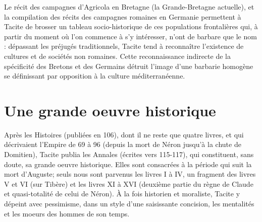 \documentclass{cornouaille}
\begin{document}
Le récit des campagnes d'Agricola en Bretagne (la Grande-Bretagne actuelle),
 et la compilation des récits des campagnes romaines en Germanie
 permettent à Tacite de brosser 
un tableau socio-historique de ces populations frontalières qui,
 à partir du moment où l'on commence à s'y intéresser,
 n'ont de barbare que le nom :
 dépassant les préjugés traditionnels,
 Tacite tend à reconnaître l'existence de cultures 
et de sociétés non romaines.
 Cette reconnaissance indirecte de la spécificité des Bretons et des Germains 
détruit l'image d'une barbarie homogène se définissant 
par opposition à la culture méditerranéenne.

\section{Une grande oeuvre historique}
Après les Histoires (publiées en 106), 
dont il ne reste que quatre livres, 
et qui décrivaient l'Empire de 69 à 96 
(depuis la mort de Néron jusqu'à la chute de Domitien), 
Tacite publia les Annales (écrites vers 115-117), 
qui constituent, sans doute, sa grande oeuvre historique. Elles sont consacrées à la période qui suit la mort d'Auguste; seuls nous sont parvenus les livres I à IV, un fragment des livres V et VI (sur Tibère) et les livres XI à XVI (deuxième partie du règne de Claude et quasi-totalité de celui de Néron). À la fois historien et moraliste, Tacite y dépeint avec pessimisme, dans un style d'une saisissante concision, les mentalités et les moeurs des hommes de son temps.
\end{document}
